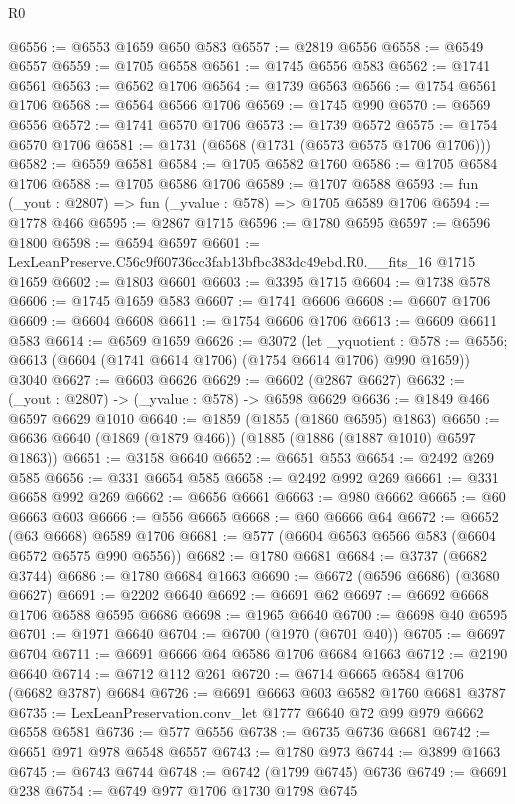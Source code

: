 \begin{lexlean}{R0}
\begin{coremodule}
@6556 := @6553 @1659 @650 @583
@6557 := @2819 @6556
@6558 := @6549 @6557
@6559 := @1705 @6558
@6561 := @1745 @6556 @583
@6562 := @1741 @6561
@6563 := @6562 @1706
@6564 := @1739 @6563
@6566 := @1754 @6561 @1706
@6568 := @6564 @6566 @1706
@6569 := @1745 @990
@6570 := @6569 @6556
@6572 := @1741 @6570 @1706
@6573 := @1739 @6572
@6575 := @1754 @6570 @1706
@6581 := @1731 (@6568 (@1731 (@6573 @6575 @1706 @1706)))
@6582 := @6559 @6581
@6584 := @1705 @6582 @1760
@6586 := @1705 @6584 @1706
@6588 := @1705 @6586 @1706
@6589 := @1707 @6588
@6593 := fun (_yout : @2807) => fun (_yvalue : @578) => @1705 @6589 @1706
@6594 := @1778 @466
@6595 := @2867 @1715
@6596 := @1780 @6595
@6597 := @6596 @1800
@6598 := @6594 @6597
@6601 := LexLeanPreserve.C56c9f60736cc3fab13bfbc383dc49ebd.R0.__fits_16 @1715 @1659
@6602 := @1803 @6601
@6603 := @3395 @1715
@6604 := @1738 @578
@6606 := @1745 @1659 @583
@6607 := @1741 @6606
@6608 := @6607 @1706
@6609 := @6604 @6608
@6611 := @1754 @6606 @1706
@6613 := @6609 @6611 @583
@6614 := @6569 @1659
@6626 := @3072
    (let _yquotient : @578 := @6556;
    @6613 (@6604 (@1741 @6614 @1706) (@1754 @6614 @1706) @990 @1659))
    @3040
@6627 := @6603 @6626
@6629 := @6602 (@2867 @6627)
@6632 := (_yout : @2807) -> (_yvalue : @578) -> @6598 @6629
@6636 := @1849 @466 @6597 @6629 @1010
@6640 := @1859 (@1855 (@1860 @6595) @1863)
@6650 := @6636 @6640 (@1869 (@1879 @466)) (@1885 (@1886 (@1887 @1010) @6597 @1863))
@6651 := @3158 @6640
@6652 := @6651 @553
@6654 := @2492 @269 @585
@6656 := @331 @6654 @585
@6658 := @2492 @992 @269
@6661 := @331 @6658 @992 @269
@6662 := @6656 @6661
@6663 := @980 @6662
@6665 := @60 @6663 @603
@6666 := @556 @6665
@6668 := @60 @6666 @64
@6672 := @6652 (@63 @6668) @6589 @1706
@6681 := @577 (@6604 @6563 @6566 @583 (@6604 @6572 @6575 @990 @6556))
@6682 := @1780 @6681
@6684 := @3737 (@6682 @3744)
@6686 := @1780 @6684 @1663
@6690 := @6672 (@6596 @6686) (@3680 @6627)
@6691 := @2202 @6640
@6692 := @6691 @62
@6697 := @6692 @6668 @1706 @6588 @6595 @6686
@6698 := @1965 @6640
@6700 := @6698 @40 @6595
@6701 := @1971 @6640
@6704 := @6700 (@1970 (@6701 @40))
@6705 := @6697 @6704
@6711 := @6691 @6666 @64 @6586 @1706 @6684 @1663
@6712 := @2190 @6640
@6714 := @6712 @112 @261
@6720 := @6714 @6665 @6584 @1706 (@6682 @3787) @6684
@6726 := @6691 @6663 @603 @6582 @1760 @6681 @3787
@6735 := LexLeanPreservation.conv_let @1777 @6640 @72 @99 @979 @6662 @6558 @6581
@6736 := @577 @6556
@6738 := @6735 @6736 @6681
@6742 := @6651 @971 @978 @6548 @6557
@6743 := @1780 @973
@6744 := @3899 @1663
@6745 := @6743 @6744
@6748 := @6742 (@1799 @6745) @6736
@6749 := @6691 @238
@6754 := @6749 @977 @1706 @1730 @1798 @6745

\end{coremodule}
\end{lexlean}
